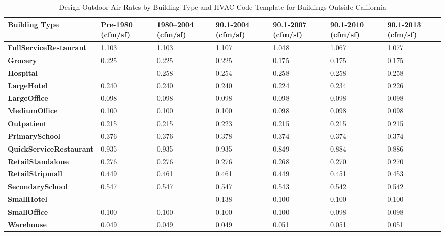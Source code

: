 \begin{table}
\small
\centering
\caption[Design Outdoor Air Rates---Outside California]{Design Outdoor Air Rates by Building Type and HVAC Code Template for Buildings Outside California}
\label{tab:outdoor_air_table}
\begin{tabular}{|p{2.5cm}|p{1.4cm}|p{1.4cm}|p{1.4cm}|p{1.4cm}|p{1.4cm}|p{1.4cm}|}
\hline
\textbf{Building   Type} &
  \textbf{Pre-1980 (cfm/sf)} &
  \textbf{1980--2004   (cfm/sf)} &
  \textbf{90.1-2004 (cfm/sf)} &
  \textbf{90.1-2007 (cfm/sf)} &
  \textbf{90.1-2010 (cfm/sf)} &
  \textbf{90.1-2013 (cfm/sf)} \\ \hline
\textbf{FullService\-Restaurant}  & 1.103 & 1.103 & 1.107 & 1.048 & 1.067 & 1.077 \\ \hline
\textbf{Grocery}                 & 0.225     & 0.225 & 0.225 & 0.175 & 0.175 & 0.175 \\ \hline
\textbf{Hospital}                 & -     & 0.258 & 0.254 & 0.258 & 0.258 & 0.258 \\ \hline
\textbf{LargeHotel}               & 0.240 & 0.240 & 0.240 & 0.224 & 0.234 & 0.226 \\ \hline
\textbf{LargeOffice}              & 0.098 & 0.098 & 0.098 & 0.098 & 0.098 & 0.098 \\ \hline
\textbf{MediumOffice}             & 0.100 & 0.100 & 0.100 & 0.098 & 0.098 & 0.098 \\ \hline
\textbf{Outpatient}               & 0.215 & 0.215 & 0.223 & 0.215 & 0.215 & 0.215 \\ \hline
\textbf{PrimarySchool}            & 0.376 & 0.376 & 0.378 & 0.374 & 0.374 & 0.374 \\ \hline
\textbf{QuickService\-Restaurant} & 0.935 & 0.935 & 0.935 & 0.849 & 0.884 & 0.886 \\ \hline
\textbf{RetailStandalone}         & 0.276 & 0.276 & 0.276 & 0.268 & 0.270 & 0.270 \\ \hline
\textbf{RetailStripmall}          & 0.449 & 0.461 & 0.461 & 0.449 & 0.451 & 0.453 \\ \hline
\textbf{SecondarySchool}          & 0.547 & 0.547 & 0.547 & 0.543 & 0.542 & 0.542 \\ \hline
\textbf{SmallHotel}               & -     & -     & 0.138 & 0.100 & 0.100 & 0.100 \\ \hline
\textbf{SmallOffice}              & 0.100 & 0.100 & 0.100 & 0.100 & 0.098 & 0.098 \\ \hline
\textbf{Warehouse}                & 0.049 & 0.049 & 0.049 & 0.051 & 0.051 & 0.051 \\ \hline
\end{tabular}
\end{table}